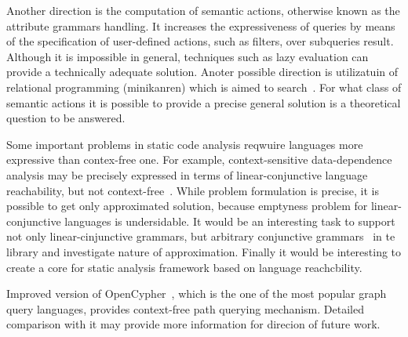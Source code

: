 Another direction is the computation of semantic actions, otherwise known as the attribute grammars handling. 
It increases the expressiveness of queries by means of the specification of user-defined actions, such as filters, over subqueries result. 
Although it is impossible in general, techniques such as lazy evaluation can provide a technically adequate solution.
Anoter possible direction is utilizatuin of relational programming (minikanren) which is aimed to search~\cite{DB}.
For what class of semantic actions it is possible to provide a precise general solution is a theoretical question to be answered. 

Some important problems in static code analysis reqwuire languages more expressive than contex-free one.
For example, context-sensitive data-dependence analysis may be precisely expressed in terms of linear-conjunctive language~\cite{Okhotin2003LCL} reachability, but not context-free~\cite{LCLReachability}.
While problem formulation is precise, it is possible to get only approximated solution, because emptyness problem for linear-conjunctive languages is undersidable.
It would be an interesting task to support not only linear-cinjunctive grammars, but arbitrary conjunctive grammars~\cite{okhotin2001conjunctive} in te library and investigate nature of approximation.
Finally it would be interesting to create a core for static analysis framework based on language reachcbility.

Improved version of OpenCypher~\cite{OpenCypherPR}, which is the one of the most popular graph query languages, provides context-free path querying mechanism.
Detailed comparison with it may provide more information for direcion of future work.
